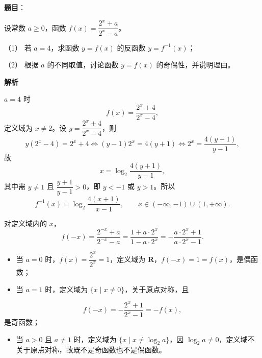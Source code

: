\begin{answer}

\textbf{题目}：

设常数 $a\geqslant0$，函数 $f(x)=\dfrac{2^x+a}{2^x-a}$。

（1） 若 $a=4$，求函数 $y=f(x)$ 的反函数 $y=f^{-1}(x)$；

（2） 根据 $a$ 的不同取值，讨论函数 $y=f(x)$ 的奇偶性，并说明理由。

\textbf{解析}


$a=4$ 时
\nopagebreak[4]
\[f(x)=\frac{2^x+4}{2^x-4},\]
定义域为 $x\neq2$。设 $y=\dfrac{2^x+4}{2^x-4}$，则
\nopagebreak[4]
\[y(2^x-4)=2^x+4\iff(y-1)2^x=4(y+1)\iff2^x=\frac{4(y+1)}{y-1},\]
故
\nopagebreak[4]
\[x=\log_2\frac{4(y+1)}{y-1},\]
其中需 $y\neq1$ 且 $\dfrac{y+1}{y-1}>0$，即 $y<-1$ 或 $y>1$。所以
\nopagebreak[4]
\[f^{-1}(x)=\log_2\frac{4(x+1)}{x-1},\qquad x\in(-\infty,-1)\cup(1,+\infty).\]


对定义域内的 $x$，
\nopagebreak[4]
\[f(-x)=\frac{2^{-x}+a}{2^{-x}-a}=\frac{1+a\cdot2^x}{1-a\cdot2^x}=-\frac{a\cdot2^x+1}{a\cdot2^x-1}.\]

\begin{itemize}
\item 当 $a=0$ 时，$f(x)=\dfrac{2^x}{2^x}=1$，定义域为 $\mathbf R$，$f(-x)=1=f(x)$，是偶函数；
\item 当 $a=1$ 时，定义域为 $\{x\mid x\neq0\}$，关于原点对称，且
\end{itemize}
\nopagebreak[4]
\[f(-x)=-\frac{2^x+1}{2^x-1}=-f(x),\]
是奇函数；
\begin{itemize}
\item 当 $a>0$ 且 $a\neq1$ 时，定义域为 $\{x\mid x\neq\log_2a\}$，因 $\log_2a\neq0$，定义域不关于原点对称，故既不是奇函数也不是偶函数。
\end{itemize}



\end{answer}

